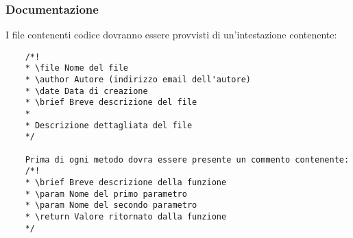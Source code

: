 	\subsubsection{Documentazione}
	I file contenenti codice dovranno essere provvisti di un'intestazione contenente:
	\begin{lstlisting}
    /*!
  	* \file Nome del file
  	* \author Autore (indirizzo email dell'autore)
  	* \date Data di creazione
  	* \brief Breve descrizione del file
  	*
  	* Descrizione dettagliata del file
  	*/
  	
  	Prima di ogni metodo dovra essere presente un commento contenente:
  	/*!
  	* \brief Breve descrizione della funzione
  	* \param Nome del primo parametro
  	* \param Nome del secondo parametro
  	* \return Valore ritornato dalla funzione
  	*/
    \end{lstlisting}